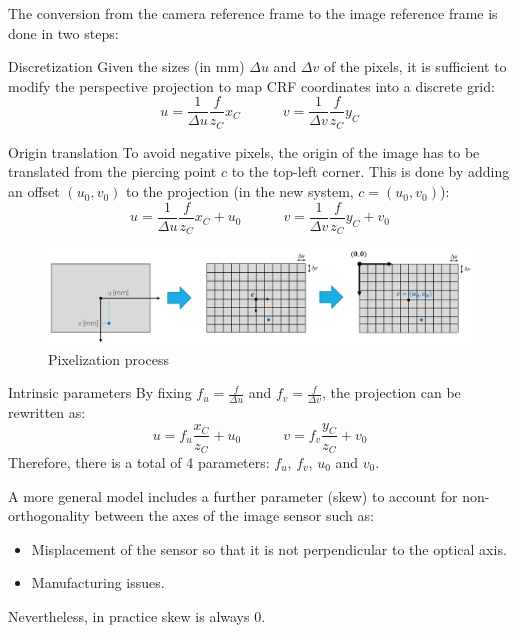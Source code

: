 The conversion from the camera reference frame to the image reference frame
is done in two steps:
\begin{descriptionlist}
    \item[Discretization] 
        Given the sizes (in mm) $\Delta u$ and $\Delta v$ of the pixels,
        it is sufficient to modify the perspective projection to map CRF coordinates into a discrete grid:
        \[ 
            u = \frac{1}{\Delta u}\frac{f}{z_C}x_C 
            \hspace{3em} 
            v = \frac{1}{\Delta v}\frac{f}{z_C}y_C 
        \]

    \item[Origin translation] 
        To avoid negative pixels, the origin of the image has to be translated from the piercing point $c$ to the top-left corner.
        This is done by adding an offset $(u_0, v_0)$ to the projection (in the new system, $c = (u_0, v_0)$):
        \[ 
            u = \frac{1}{\Delta u}\frac{f}{z_C}x_C + u_0
            \hspace{3em} 
            v = \frac{1}{\Delta v}\frac{f}{z_C}y_C +v_0
        \]

    \begin{figure}[H]
        \centering
        \includegraphics[width=0.9\linewidth]{./img/_pixelization.pdf}
        \caption{Pixelization process}
    \end{figure}

    \item[Intrinsic parameters] 
        By fixing $f_u = \frac{f}{\Delta u}$ and $f_v = \frac{f}{\Delta v}$, the projection can be rewritten as:
        \[ 
            u = f_u\frac{x_C}{z_C} + u_0
            \hspace{3em} 
            v = f_v\frac{y_C}{z_C} +v_0
        \]
        Therefore, there is a total of 4 parameters: $f_u$, $f_v$, $u_0$ and $v_0$.
        
        \begin{remark}
            A more general model includes a further parameter (skew)
            to account for non-orthogonality between the axes of the image sensor such as:
            \begin{itemize}
                \item Misplacement of the sensor so that it is not perpendicular to the optical axis.
                \item Manufacturing issues.
            \end{itemize}

            Nevertheless, in practice skew is always 0.
        \end{remark}
\end{descriptionlist}


